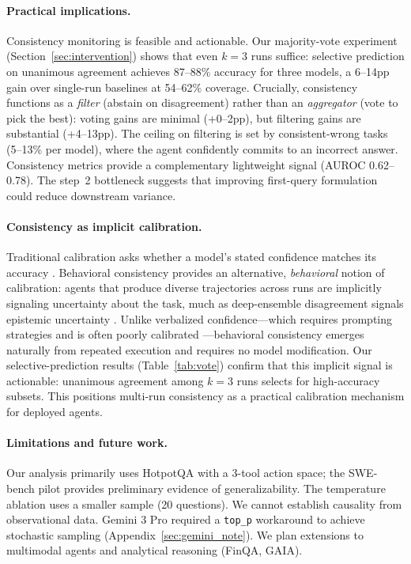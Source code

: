 \documentclass{article}
\begin{document}
\paragraph{Practical implications.}
Consistency monitoring is feasible and actionable. Our majority-vote experiment (Section~\ref{sec:intervention}) shows that even $k\!=\!3$ runs suffice: selective prediction on unanimous agreement achieves 87--88\% accuracy for three models, a 6--14pp gain over single-run baselines at 54--62\% coverage. Crucially, consistency functions as a \emph{filter} (abstain on disagreement) rather than an \emph{aggregator} (vote to pick the best): voting gains are minimal (+0--2pp), but filtering gains are substantial (+4--13pp). The ceiling on filtering is set by consistent-wrong tasks (5--13\% per model), where the agent confidently commits to an incorrect answer. Consistency metrics provide a complementary lightweight signal (AUROC 0.62--0.78). The step~2 bottleneck suggests that improving first-query formulation could reduce downstream variance.

\paragraph{Consistency as implicit calibration.}
Traditional calibration asks whether a model's stated confidence matches its accuracy \citep{kadavath2022language}. Behavioral consistency provides an alternative, \emph{behavioral} notion of calibration: agents that produce diverse trajectories across runs are implicitly signaling uncertainty about the task, much as deep-ensemble disagreement signals epistemic uncertainty \citep{lakshminarayanan2017simple}. Unlike verbalized confidence---which requires prompting strategies and is often poorly calibrated \citep{xiong2024llms, tian2023just}---behavioral consistency emerges naturally from repeated execution and requires no model modification. Our selective-prediction results (Table~\ref{tab:vote}) confirm that this implicit signal is actionable: unanimous agreement among $k\!=\!3$ runs selects for high-accuracy subsets. This positions multi-run consistency as a practical calibration mechanism for deployed agents.

\paragraph{Limitations and future work.}
Our analysis primarily uses HotpotQA with a 3-tool action space; the SWE-bench pilot provides preliminary evidence of generalizability. The temperature ablation uses a smaller sample (20 questions). We cannot establish causality from observational data. Gemini 3 Pro required a \texttt{top\_p} workaround to achieve stochastic sampling (Appendix~\ref{sec:gemini_note}). We plan extensions to multimodal agents and analytical reasoning (FinQA, GAIA).
\end{document}
